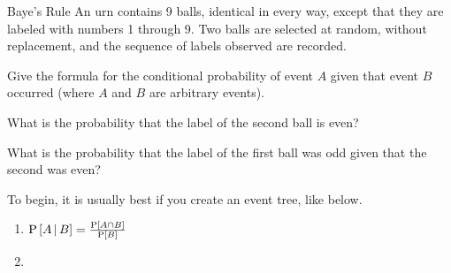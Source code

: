 		\begin{example}{Baye's Rule}
			An urn contains 9 balls, identical in every way, except that they are labeled with numbers 1 through 9.
			Two balls are selected at random, without replacement, and the sequence of labels observed are recorded.
			\begin{boldalphlist}
				\item Give the formula for the conditional probability of event $A$ given that event $B$ occurred (where $A$ and $B$ are arbitrary events).
				\item What is the probability that the label of the second ball is even?
				\item What is the probability that the label of the first ball was odd given that the second was even?
			\end{boldalphlist}

			\tcblower
			To begin, it is usually best if you create an event tree, like below.
			\newline
			\begin{center}
				
			\end{center}
			\begin{enumerate}[label=(\alph*)]
				\item $\operatorname{\operatorname{P}} \left[ A \operatorname{\vert} B \right] = \frac{\operatorname{\operatorname{P}} \left[ A \cap B \right]}{\operatorname{\operatorname{P}} \left[ B \right]}$
				\item
			\end{enumerate}
		\end{example}

